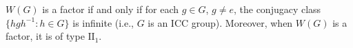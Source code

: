 $W(G)$ is a factor if and only if for each $g \in G$, $g \neq e$, the conjugacy class $\{hgh^{-1} : h \in G\}$ is infinite (i.e., $G$ is an ICC group). Moreover, when $W(G)$ is a factor, it is of type $\mathrm{II}_1$.
